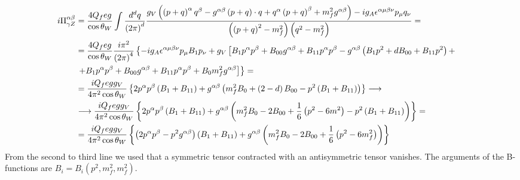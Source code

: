 \begin{align*}
i\Pi^{\alpha\beta}_{\gamma Z} & = \frac{4Q_feg}{\cos\theta_W} \int \frac{d^dq}{\left( 2\pi \right)^d} \frac{g_V \left( \left( p+q \right)^{\alpha}q^{\beta} - g^{\alpha\beta} \left( p+q \right) \cdot q + q^{\alpha} \left( p+q \right)^{\beta} + m^2_f g^{\alpha\beta} \right) - i g_A \epsilon^{\alpha\mu\beta\nu} p_{\mu}q_{\nu}}{\left( \left( p+q \right)^2 -m^2_f \right) \left( q^2 - m^2_f \right)} = & \\
& = \frac{4Q_feg}{\cos\theta_W} \frac{i\pi^2}{\left( 2\pi \right)^4} \left\lbrace -ig_A \epsilon^{\alpha\mu\beta\nu}p_{\mu}B_1 p_{\nu} + g_V \left[ B_1 p^{\alpha}p^{\beta} + B_{00}g^{\alpha\beta} + B_{11} p^{\alpha}p^{\beta} - g^{\alpha\beta} \left( B_1 p^2 + d B_{00} + B_{11} p^2 \right) + \right. \right. & \\
& \left. \left. + B_1 p^{\alpha}p^{\beta} + B_{00} g^{\alpha\beta} + B_{11} p^{\alpha}p^{\beta} + B_0 m^2_f g^{\alpha\beta} \right]\right\rbrace = & \\
& = \frac{iQ_fegg_V}{4\pi^2\cos\theta_W} \left\lbrace 2 p^{\alpha}p^{\beta} \left( B_1 + B_{11} \right) + g^{\alpha\beta} \left( m^2_f B_0 + \left( 2 - d \right) B_{00} -p^2 \left( B_1 + B_{11} \right) \right) \right\rbrace \longrightarrow & \\
& \longrightarrow \frac{iQ_fegg_V}{4\pi^2\cos\theta_W} \left\lbrace 2 p^{\alpha}p^{\beta} \left( B_1 + B_{11} \right) + g^{\alpha\beta} \left( m^2_f B_0 - 2 B_{00} + \frac{1}{6} \left( p^2 - 6m^2 \right) -p^2 \left( B_1 + B_{11} \right) \right) \right\rbrace = & \\
& = \frac{iQ_fegg_V}{4\pi^2\cos\theta_W} \left\lbrace \left( 2 p^{\alpha}p^{\beta} - p^2g^{\alpha\beta} \right) \left( B_1 + B_{11} \right) + g^{\alpha\beta} \left( m^2_f B_0 - 2 B_{00} + \frac{1}{6} \left( p^2 - 6m^2_f \right) \right) \right\rbrace &
\end{align*}
From the second to third line we used that a symmetric tensor contracted with an antisymmetric tensor vanishes. The arguments of the B-functions are $B_i = B_i(p^2,m^2_f,m^2_f)$.\\

